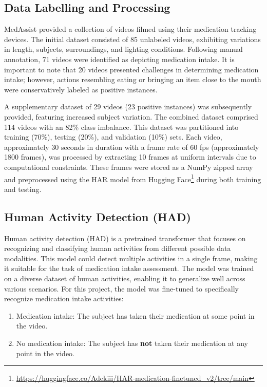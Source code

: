 \documentclass[a4paper,12pt]{article}
\begin{document}
\subsection{Data Labelling and Processing}

MedAssist provided a collection of videos filmed using their medication tracking devices. The initial dataset consisted of 85 unlabeled videos, exhibiting variations in length, subjects, surroundings, and lighting conditions. Following manual annotation, 71 videos were identified as depicting medication intake. It is important to note that 20 videos presented challenges in determining medication intake; however, actions resembling eating or bringing an item close to the mouth were conservatively labeled as positive instances.

A supplementary dataset of 29 videos (23 positive instances) was subsequently provided, featuring increased subject variation. The combined dataset comprised 114 videos with an 82\% class imbalance. This dataset was partitioned into training (70\%), testing (20\%), and validation (10\%) sets. Each video, approximately 30 seconds in duration with a frame rate of 60 fps (approximately 1800 frames), was processed by extracting 10 frames at uniform intervals due to computational constraints. These frames were stored as a NumPy zipped array and preprocessed using the HAR model from Hugging Face\footnote{\url{https://huggingface.co/Adekiii/HAR-medication-finetuned_v2/tree/main}} during both training and testing.


\subsection{Human Activity Detection (HAD)}
Human activity detection (HAD) is a pretrained transformer that focuses on recognizing
and classifying human activities from different possible data modalities. This model could detect multiple activities in a single frame, making it suitable for the task of medication intake assessment. The model was trained on a diverse dataset of human activities, enabling it to generalize well across various scenarios. For this project, the model was fine-tuned to specifically recognize medication intake activities: 
\renewcommand{\labelenumi}{\Roman{enumi}.}
\begin{enumerate}
    \item Medication intake: The subject has taken their medication at some point in the video.
    \item No medication intake: The subject has \textbf{not} taken their medication at any point in the video.
\end{enumerate}
\end{document}
